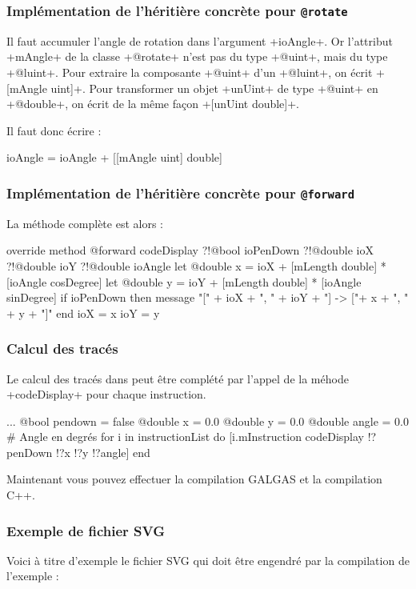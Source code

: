 \subsubsection{Implémentation de l'héritière concrète pour \texttt{@rotate}}
Il faut accumuler l'angle de rotation dans l'argument \ggs+ioAngle+. Or l'attribut \ggs+mAngle+ de la classe \ggs+@rotate+ n'est pas du type \ggs+@uint+, mais du type \ggs+@luint+. Pour extraire la composante \ggs+@uint+ d’un \ggs+@luint+, on écrit \ggs+[mAngle uint]+. Pour transformer un objet \ggs+unUint+ de type \ggs+@uint+ en \ggs+@double+, on écrit de la même façon \ggs+[unUint double]+. 


 Il faut donc écrire :
\begin{galgas}
ioAngle = ioAngle + [[mAngle uint] double]
\end{galgas}

\subsubsection{Implémentation de l'héritière concrète pour \texttt{@forward}}
La méthode complète est alors :

\begin{galgas}
override method @forward codeDisplay
  ?!@bool ioPenDown
  ?!@double ioX
  ?!@double ioY
  ?!@double ioAngle
{
  let @double x = ioX + [mLength double] * [ioAngle cosDegree]
  let @double y = ioY + [mLength double] * [ioAngle sinDegree]
  if ioPenDown then
    message "[" + ioX + ", " + ioY + "] -> ["+ x + ", " + y + "]\n"
  end
  ioX = x
  ioY = y
}
\end{galgas}

\subsubsection{Calcul des tracés}
Le calcul des tracés dans  peut être complété par l'appel de la méhode \ggs+codeDisplay+ pour chaque instruction.
\begin{galgas}
  ...
  @bool pendown = false
  @double x = 0.0
  @double y = 0.0
  @double angle = 0.0 # Angle en degrés
  for i in instructionList do
    [i.mInstruction codeDisplay !?penDown !?x !?y !?angle]
  end
\end{galgas}

Maintenant vous pouvez effectuer la compilation GALGAS et la compilation C++.

\subsubsection{Exemple de fichier SVG}
Voici à titre d'exemple le fichier SVG qui doit être engendré par la compilation de l'exemple  :

